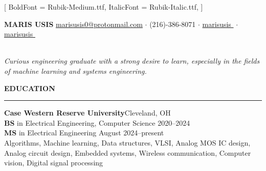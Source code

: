 \documentclass[notitlepage,10pt,a4paper]{article}
\newcommand{\linka}[2]{
   \textcolor{linkb}{\href{#1}{#2}}
}
\newenvironment{resumesection}[1]{
    \header{#1}
}{}
\newcommand{\header}[1]{
    \vspace{2pt}
    \textcolor{accent1}{\Large \textbf{#1}}
    \vspace{6pt}\hrule\vspace{4pt}
}
\newcommand{\thingsep}{
    \vspace{4pt}
}
\begin{document}
\setmainfont{Rubik-Regular.ttf}[
    BoldFont = Rubik-Medium.ttf,
    ItalicFont = Rubik-Italic.ttf,
]

\setlength{\parindent}{0pt}

\textcolor{accent1}{\huge \textbf{MARIS USIS}} \hfill\linka{mailto:marisusis0@protonmail.com}{marisusis0@protonmail.com} $\cdot$ (216)-386-8071 $\cdot$ \linka{https://linkedin.com/in/marisusis}{marisusis\,\,\faLinkedinSquare} $\cdot$ \linka{https://github.com/marisusis}{marisusis\,\,\faGithub}
\thingsep \\
\textit{Curious engineering graduate with a strong desire to learn, especially in the fields of machine learning and systems engineering.}
\thingsep

\begin{resumesection}{EDUCATION}
    \textcolor{accent2}{\textbf{\large Case Western Reserve University}}\hfill Cleveland, OH\\
    \textbf{BS} in Electrical Engineering, Computer Science \hfill 2020--2024\\
    \textbf{MS} in Electrical Engineering  \hfill August 2024--present\\
    {\small Algorithms, Machine learning, Data structures, VLSI, Analog MOS IC design, Analog circuit design, Embedded systems, Wireless communication, Computer vision, Digital signal processing}
    \thingsep

\end{resumesection}
\end{document}
